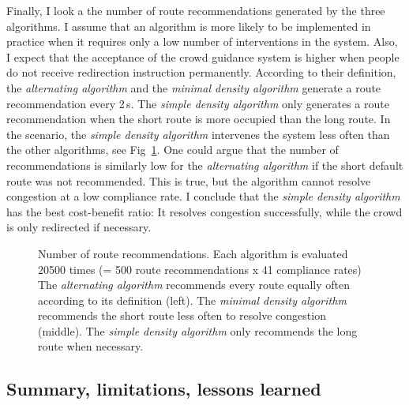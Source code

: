 Finally, I look a the number of route recommendations generated by the three algorithms. I assume that an algorithm is more likely to be implemented in practice when it requires only a low number of interventions in the system. Also, I expect that the acceptance of the crowd guidance system is higher when people do not receive redirection instruction permanently.
According to their definition, the \textit{alternating algorithm} and the \textit{minimal density algorithm} generate a route recommendation every 2\,s. The \textit{simple density algorithm} only generates a route recommendation when the short route is more occupied than the long route.  In the scenario, the \textit{simple density algorithm} intervenes the system less often than the other algorithms, see Fig~\ref{fig:numberofRouteRecs}. One could argue that the number of recommendations is similarly low for the \textit{alternating algorithm} if the short default route was not recommended. This is true, but the algorithm cannot resolve congestion at a low compliance rate. I conclude that the \textit{simple density algorithm} has the best cost-benefit ratio: It resolves congestion successfully, while the crowd is only redirected if necessary.




\begin{figure}[hbt!]
\centering
{}
\caption[Number of route recommendations]{Number of route recommendations. Each algorithm is evaluated 20500 times (= 500 route recommendations x 41 compliance rates) 
The \textit{alternating algorithm} recommends every route equally often according to its definition (left). The \textit{minimal density algorithm} recommends the short route less often to resolve congestion (middle). The \textit{simple density algorithm} only recommends the long route when necessary.  }
\label{fig:numberofRouteRecs}
\end{figure}

\FloatBarrier


\subsection{Summary, limitations, lessons learned}

